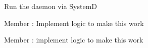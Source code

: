 \begin{DoxyRefList}
Run the daemon via SystemD  
\item[Member \doxylink{tcfs__daemon_8c_a679ec79d065ad812032851f6872caee6}{terminate} ]\label{todo__todo000008}%
%
\+: Implement logic to make this work  
\item[Member \doxylink{tcfs__daemon_8c_af7e1db76e3a69a4b0484910b1f7562da}{terminate\+\_\+mutex} ]\label{todo__todo000009}%
%
\+: implement logic to make this work 
\end{DoxyRefList}